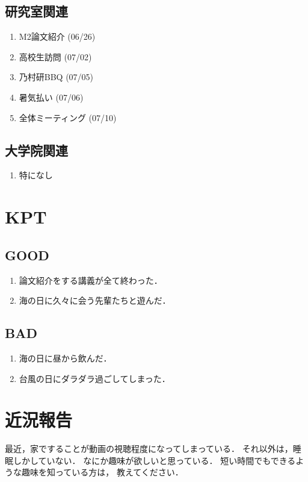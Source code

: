 \documentclass[fleqn, 14pt]{extarticlej}
\begin{document}
\subsection{研究室関連}
\begin{enumerate}
    \item M2論文紹介
        \hfill
        (06/26)
    \item 高校生訪問
        \hfill
        (07/02)
    \item 乃村研BBQ
        \hfill
        (07/05)
    \item 暑気払い
        \hfill
        (07/06)
    \item 全体ミーティング
        \hfill
        (07/10)
\end{enumerate}

\subsection{大学院関連}
\begin{enumerate}
    \item 特になし
\end{enumerate}

\section{KPT}
\subsection{GOOD}
\begin{enumerate}
    \item 論文紹介をする講義が全て終わった．
    \item 海の日に久々に会う先輩たちと遊んだ．
\end{enumerate}

\subsection{BAD}
\begin{enumerate}
    \item 海の日に昼から飲んだ．
    \item 台風の日にダラダラ過ごしてしまった．
\end{enumerate}

\section{近況報告}
最近，家ですることが動画の視聴程度になってしまっている．
それ以外は，睡眠しかしていない．
なにか趣味が欲しいと思っている．
短い時間でもできるような趣味を知っている方は，
教えてください．
\end{document}
